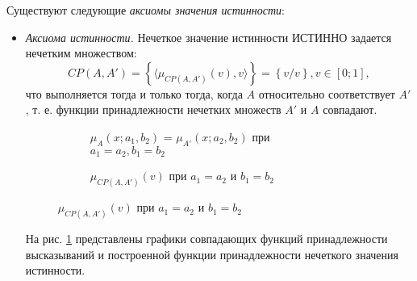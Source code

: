 Существуют следующие \textit{аксиомы значения истинности}:
\begin{itemize}
\item \textit{Аксиома истинности.} Нечеткое значение истинности ИСТИННО задается нечетким множеством:
\begin{equation*} 
CP(A,A') = \left\{\langle\mu_{CP(A,A')}(v), v\rangle\right\} = \left\{v/v\right\}, v \in [0; 1],
\end{equation*}
что выполняется тогда и только тогда, когда $A$ относительно соответствует $A'$, т. е. функции принадлежности нечетких множеств $A'$ и $A$ совпадают.


\begin{figure}[ht]
	\newcommand{\aOne}{0.5}
	\newcommand{\bOne}{0.05}
	\newcommand{\aTwo}{0.5}
	\newcommand{\bTwo}{0.05}
	\begin{subfigure}[t]{0.5\textwidth}
		\caption{$\mu_A(x; a_1, b_2)$ = $\mu_{A'}(x; a_2, b_2)$ при $a_1 = a_2, b_1 = b_2$}
	\end{subfigure}
	\hfill
	\begin{subfigure}[t]{0.5\textwidth}
		\caption{$\mu_{CP(A,A')}(v)$ при $a_1 = a_2$ и $b_1 = b_2$}
	\end{subfigure}
	\label{fig:ftv-gauss-true}
\end{figure}

На рис. \ref{fig:ftv-gauss-true} представлены графики совпадающих функций принадлежности высказываний и построенной функции принадлежности нечеткого значения истинности.


\end{itemize}
